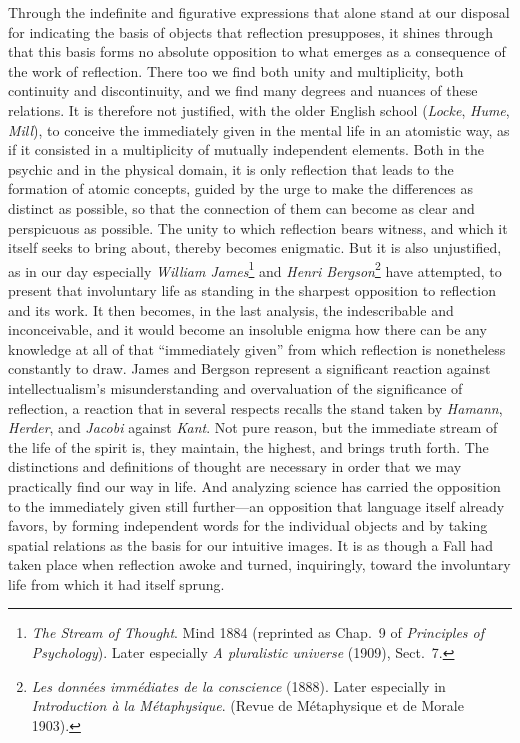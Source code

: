 \documentclass[12pt,a4paper]{book}
\newcommand{\opage}[1]{\marginnote{\footnotesize\textit{[#1]}}}
\begin{document}
\opage{8}Through the indefinite and figurative expressions that alone stand at
our disposal for indicating the basis of objects that reflection
presupposes, it shines through that this basis forms no absolute
opposition to what emerges as a consequence of the work of reflection.
There too we find both unity and multiplicity, both continuity and
discontinuity, and we find many degrees and nuances of these relations.
It is therefore not justified, with the older English school
(\emph{Locke}, \emph{Hume}, \emph{Mill}), to conceive the immediately
given in the mental life in an atomistic way, as if it consisted in a
multiplicity of mutually independent elements. Both in the psychic and
in the physical domain, it is only reflection that leads to the
formation of atomic concepts, guided by the urge to make the differences
as distinct as possible, so that the connection of them can become as
clear and perspicuous as possible. The unity to which reflection bears
witness, and which it itself seeks to bring about, thereby becomes
enigmatic. But it is also unjustified, as in our day especially
\emph{William James}\footnote{\emph{The Stream of Thought}. Mind 1884
(reprinted as Chap.\ 9 of \emph{Principles of Psychology}). Later
especially \emph{A pluralistic universe} (1909), Sect.\ 7.} and
\emph{Henri Bergson}\footnote{\emph{Les données immédiates de la
conscience} (1888). Later especially in \emph{Introduction à la
Métaphysique}. (Revue de Métaphysique et de Morale 1903).} have
attempted, to present that involuntary life as standing in the sharpest
opposition to reflection and its work. It then becomes, in the last
analysis, the indescribable and inconceivable, and it would become an
insoluble enigma how there can be any knowledge at all of that
``immediately given'' from which reflection is nonetheless constantly to
draw. James and Bergson represent a significant reaction against
intellectualism's misunderstanding and overvaluation of the significance
of reflection, a reaction that in several respects recalls the stand
taken by \emph{Hamann}, \emph{Herder}, and \emph{Jacobi} against
\emph{Kant}. Not pure reason, but the immediate stream of the life of
the spirit is, they maintain, the highest, and brings truth forth. The
distinctions and definitions of thought are necessary in order that we
may practically find our way in life. And analyzing science has carried
the opposition \opage{9}to the immediately given still further---an opposition
that language itself already favors, by forming independent words for
the individual objects and by taking spatial relations as the basis for
our intuitive images. It is as though a Fall had taken place when
reflection awoke and turned, inquiringly, toward the involuntary life
from which it had itself sprung.
\end{document}
